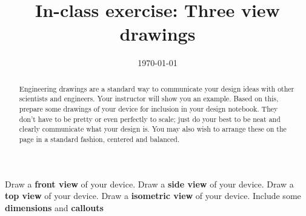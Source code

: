 \documentclass [hw,addpoints,noanswers]{exam}
\title{In-class exercise: Three view drawings}
\author{\mobeardInstructorShort}
\date{\today}
\begin{document}
\maketitle

\begin{abstract}
Engineering drawings are a standard way to communicate your design ideas with other scientists and engineers. Your instructor will show you an example. Based on this, prepare some drawings of your device for inclusion in your design notebook. They don't have to be pretty or even perfectly to scale; just do your best to be neat and clearly communicate what your design is.  You may also wish to arrange these on the page in a standard fashion, centered and balanced. 
\end{abstract}

\begin{questions}
\question[4] Draw a \textbf{front view} of your device. 
\question[4] Draw a \textbf{side view} of your device.
\question[4] Draw a \textbf{top view} of your device. 
\question[4] Draw a \textbf{isometric view} of your device. 
\question[4] Include some \textbf{dimensions} and \textbf{callouts} 
\end{questions}
\end{document}
